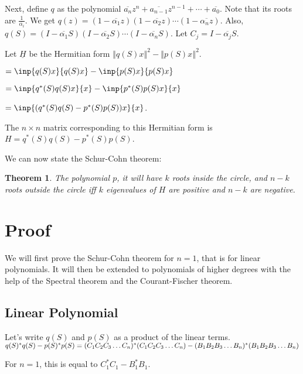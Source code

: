 \documentclass[twofold]{article}
\newcommand*\conj[1]{\overline{#1}}
\newcommand*\adj[1]{#1^*}
\newcommand*\norm[1]{\left \Vert #1 \right\Vert}
\theoremstyle{plain}
\newtheorem{theorem}{Theorem}
\theoremstyle{definition}
\theoremstyle{remark}
\begin{document}
Next, define \(q\) as the polynomial \(\conj{a_n}z^n + \conj{a_{n-1}}z^{n-1} + \cdots + \conj{a_0}\). Note that its roots are \(\frac {1}{\conj{\alpha_i}}\). We get \(q(z) = (1 - \conj{\alpha_1}z) (1 - \conj{\alpha_2}z) \cdots (1 - \conj{\alpha_nz})\). Also, \(q(S) = (I - \conj{\alpha_1}S) (I - \conj{\alpha_2}S) \cdots (I - \conj{\alpha_n}S)\). Let \(C_j= I -  \conj{\alpha_j} S\).


Let \(\underline{H}\) be the Hermitian form \(\norm{ q(S) x }^2 - \norm{ p(S) x}^2\). 

\(= \inp{q(S)x}{q(S)x} - \inp{p(S)x}{p(S)x}\)

\(= \inp{\adj{q}(S) q(S) x}{x} - \inp{\adj{p}(S) p(S) x}{x}\)

\(= \inp{(\adj{q}(S) q(S) - \adj{p} (S) p(S) ) x}{x}\).

The \(n \times n\) matrix corresponding to this Hermitian form is  \(H = \adj{q}(S) q(S) - \adj{p}(S) p(S)\).


We can now state the Schur-Cohn theorem:

\begin{theorem}The polynomial \(p\), it will have \(k\) roots inside the circle, and \(n-k\) roots outside the circle iff \(k\) eigenvalues of \(H\) are positive and \(n-k\) are negative. \end{theorem}

\section{Proof}

We will first prove the Schur-Cohn theorem for \(n =1\), that is for linear polynomials. It will then be extended to polynomials of higher degrees with the help of the Spectral theorem and the Courant-Fischer theorem. 


\subsection{Linear Polynomial}


Let's write \(q(S)\) and \(p(S)\) as a product of the linear terms. \(\adj{q(S)} q(S) - \adj{p(S)} p(S) \\= \adj{(C_1C_2C_3 \ldots C_n)}(C_1C_2C_3\ldots C_n) - \adj{(B_1B_2B_3\ldots B_n)} (B_1B_2B_3\ldots B_n)\)

For \(n =1\), this is equal to \(\adj{C_1} C_1 - \adj{B_1} B_1\). 
\end{document}
